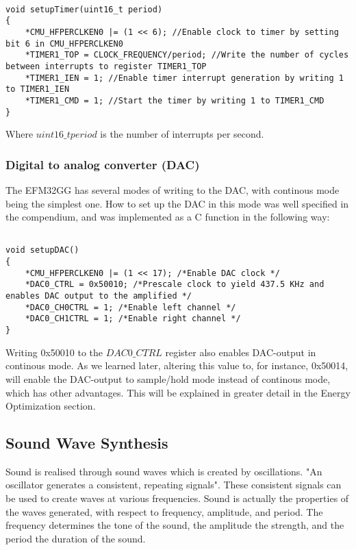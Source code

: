 \begin{lstlisting}

void setupTimer(uint16_t period)
{
	*CMU_HFPERCLKEN0 |= (1 << 6); //Enable clock to timer by setting bit 6 in CMU_HFPERCLKEN0
	*TIMER1_TOP = CLOCK_FREQUENCY/period; //Write the number of cycles between interrupts to register TIMER1_TOP
	*TIMER1_IEN = 1; //Enable timer interrupt generation by writing 1 to TIMER1_IEN
	*TIMER1_CMD = 1; //Start the timer by writing 1 to TIMER1_CMD
}

\end{lstlisting}

Where $uint16\_t period$ is the number of interrupts per second.

\subsubsection{Digital to analog converter (DAC)}

The EFM32GG has several modes of writing to the DAC, with continous mode being the simplest one. How to set up the DAC in this mode was well specified in the compendium, and was implemented as a C function in the following way:

\begin{lstlisting}

void setupDAC()
{
  	*CMU_HFPERCLKEN0 |= (1 << 17); /*Enable DAC clock */
	*DAC0_CTRL = 0x50010; /*Prescale clock to yield 437.5 KHz and enables DAC output to the amplified */
	*DAC0_CH0CTRL = 1; /*Enable left channel */
	*DAC0_CH1CTRL = 1; /*Enable right channel */
}

\end{lstlisting}

Writing 0x50010 to the $DAC0\_CTRL$ register also enables DAC-output in continous mode. As we learned later, altering  this value to, for instance, 0x50014, will enable the DAC-output to sample/hold mode instead of continous mode, which has other advantages. This will be explained in greater detail in the Energy Optimization section.

\subsection{Sound Wave Synthesis}

Sound is realised through sound waves which is created by oscillations. "An oscillator generates a consistent, repeating signals". These consistent signals can be used to create waves at various frequencies. Sound is actually the properties of the waves generated, with respect to frequency, amplitude, and period. The frequency determines the tone of the sound, the amplitude the strength, and the period the duration of the sound.

